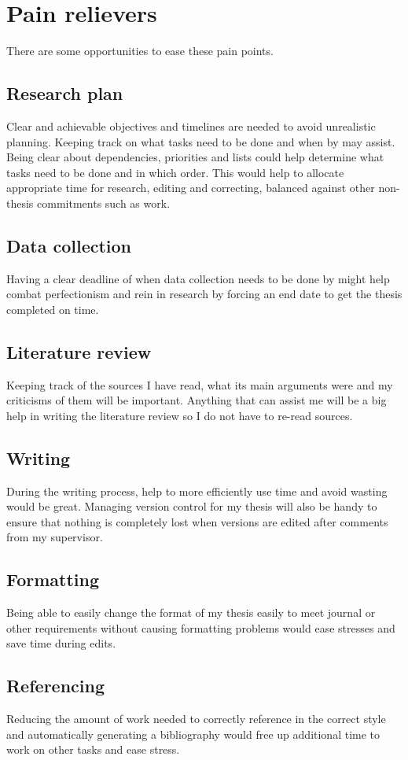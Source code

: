 \documentclass{article}
\begin{document}
\section*{Pain relievers}

There are some opportunities to ease these pain points.\par
\subsection*{Research plan}
Clear and achievable objectives and timelines are needed to avoid unrealistic planning. Keeping track on what tasks need to be done and when by may assist. Being clear about dependencies, priorities and lists could help determine what tasks need to be done and in which order. This would help to allocate appropriate time for research, editing and correcting, balanced against other non-thesis commitments such as work.
\subsection*{Data collection}
Having a clear deadline of when data collection needs to be done by might help combat perfectionism and rein in research by forcing an end date to get the thesis completed on time. 
\subsection*{Literature review}
Keeping track of the sources I have read, what its main arguments were and my criticisms of them will be important. Anything that can assist me will be a big help in writing the literature review so I do not have to re-read sources. 
\subsection*{Writing}
During the writing process, help to more efficiently use time and avoid wasting would be great. Managing version control for my thesis will also be handy to ensure that nothing is completely lost when versions are edited after comments from my supervisor.\par
\subsection*{Formatting}
Being able to easily change the format of my thesis easily to meet journal or other requirements without causing formatting problems would ease stresses and save time during edits.
\subsection*{Referencing}
Reducing the amount of work needed to correctly reference in the correct style and automatically generating a bibliography would free up additional time to work on other tasks and ease stress.\par
\end{document}

